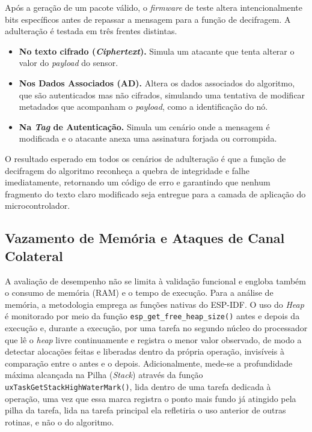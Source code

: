 Após a geração de um pacote válido, o \textit{firmware} de teste altera intencionalmente bits específicos antes de repassar a mensagem para a função de decifragem. A adulteração é testada em três frentes distintas.
\begin{itemize}
\item \textbf{No texto cifrado (\textit{Ciphertext}).} Simula um atacante que tenta alterar o valor do \textit{payload} do sensor.
\item \textbf{Nos Dados Associados (AD).} Altera os dados associados do algoritmo, que são autenticados mas não cifrados, simulando uma tentativa de modificar metadados que acompanham o \textit{payload}, como a identificação do nó.
\item \textbf{Na \textit{Tag} de Autenticação.} Simula um cenário onde a mensagem é modificada e o atacante anexa uma assinatura forjada ou corrompida.
\end{itemize}

O resultado esperado em todos os cenários de adulteração é que a função de decifragem do algoritmo reconheça a quebra de integridade e falhe imediatamente, retornando um código de erro e garantindo que nenhum fragmento do texto claro modificado seja entregue para a camada de aplicação do microcontrolador.


\subsection{Vazamento de Memória e Ataques de Canal Colateral}
A avaliação de desempenho não se limita à validação funcional e engloba também o consumo de memória (RAM) e o tempo de execução. Para a análise de memória, a metodologia emprega as funções nativas do ESP-IDF. O uso do \textit{Heap} é monitorado por meio da função \texttt{esp\_get\_free\_heap\_size()} antes e depois da execução e, durante a execução, por uma tarefa no segundo núcleo do processador que lê o \textit{heap} livre continuamente e registra o menor valor observado, de modo a detectar alocações feitas e liberadas dentro da própria operação, invisíveis à comparação entre o antes e o depois. Adicionalmente, mede-se a profundidade máxima alcançada na Pilha (\textit{Stack}) através da função \texttt{uxTaskGetStackHighWaterMark()}, lida dentro de uma tarefa dedicada à operação, uma vez que essa marca registra o ponto mais fundo já atingido pela pilha da tarefa, lida na tarefa principal ela refletiria o uso anterior de outras rotinas, e não o do algoritmo.

